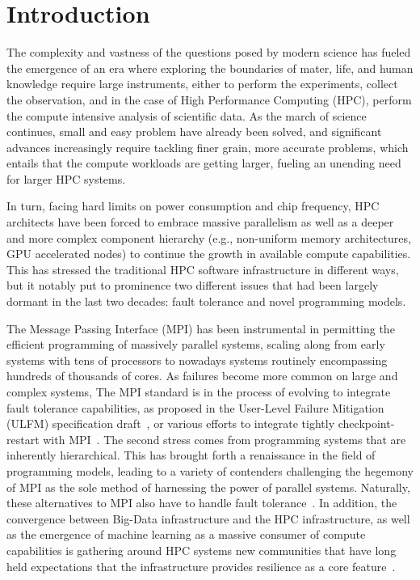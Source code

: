 \documentclass[sigconf]{acmart}
\newcommand{\ulfm}[0]{\textsc{ULFM}\xspace}
\newcommand{\mpi}[0]{\textsc{MPI}\xspace}
\begin{document}
\section{Introduction}\label{sec:intro}

The complexity and vastness of the questions posed by modern science has
fueled the emergence of an era where exploring the boundaries of mater, life,
and human knowledge require large instruments, either to perform the
experiments, collect the observation, and in the
case of High Performance Computing (HPC), perform the compute intensive
analysis of scientific data. As the march of science continues, small and
easy problem have already been solved, and significant advances increasingly
require tackling finer grain, more accurate problems, which entails that the
compute workloads are getting larger, fueling an unending need for larger
HPC systems.

In turn, facing hard limits on power consumption and chip frequency,
HPC architects have been forced to embrace massive parallelism as well as
a deeper and more complex component hierarchy (e.g., non-uniform memory architectures,
GPU accelerated nodes) to continue the growth in available compute capabilities.
This has stressed the traditional HPC software infrastructure in different 
ways, but it notably put to prominence two different issues that had been 
largely dormant in the last two decades: fault tolerance and novel programming 
models.

The Message Passing Interface (MPI) has been instrumental in 
permitting the efficient programming of massively parallel systems, scaling 
along from early systems with tens of processors to nowadays systems routinely 
encompassing hundreds of thousands of cores. As failures become more 
common on large and complex systems, The \mpi standard is in the process of 
evolving to integrate fault tolerance capabilities, as proposed in the 
User-Level Failure Mitigation (\ulfm) specification draft~\cite{Bland2013}, or 
various efforts to integrate tightly checkpoint-restart with \mpi~\cite{reinit18}.
The second stress comes from programming systems that are inherently
hierarchical. This has brought forth a renaissance in the field of
programming models, leading to a variety of contenders challenging the
hegemony of \mpi as the sole method of harnessing the power of parallel systems.
Naturally, these alternatives to \mpi also have to handle fault tolerance~\cite{7161563, doi:10.1177/1094342016669416, shmem-ft15, 10.1007/978-3-319-50995-2_5, X10-ft16}. 
In addition, the convergence
between Big-Data infrastructure and the HPC infrastructure, as well as
the emergence of machine learning as a massive consumer of compute
capabilities is gathering around HPC systems new communities that 
have long held expectations that the infrastructure provides resilience as a core feature~\cite{hadoop-ft}.
\end{document}

